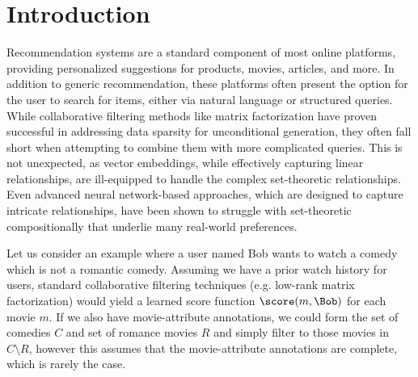 \section{Introduction}
\label{sec:introduction}
Recommendation systems are a standard component of most online platforms, providing personalized suggestions for products, movies, articles, and more.
In addition to generic recommendation, these platforms often present the option for the user to search for items, either via natural language or structured queries.
While collaborative filtering methods like matrix factorization have proven successful in addressing data sparsity for unconditional generation, they often fall short when attempting to combine them with more complicated queries. 
This is not unexpected, as vector embeddings, while effectively capturing linear relationships, are ill-equipped to handle the complex set-theoretic relationships. Even advanced neural network-based approaches, which are designed to capture intricate relationships, have been shown to struggle with set-theoretic compositionally that underlie many real-world preferences. 



Let us consider an example where a user named Bob wants to watch a comedy which is not a romantic comedy.
Assuming we have a prior watch history for users, standard collaborative filtering techniques (e.g. low-rank matrix factorization) would yield a learned score function $\score(m, \Bob)$ for each movie $m$.
If we also have movie-attribute annotations, we could form the set of comedies $C$ and set of romance movies $R$ and simply filter to those movies in $C \setminus R$, however this assumes that the movie-attribute annotations are complete, which is rarely the case.

